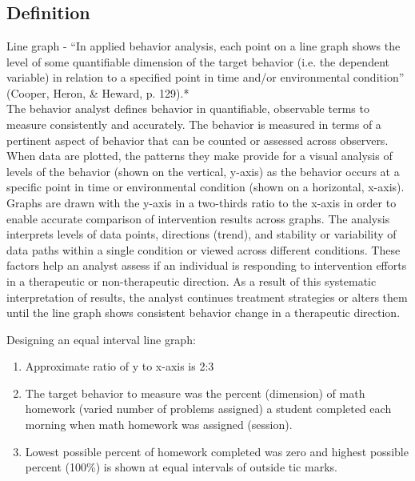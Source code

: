 \clearpage \section[\fouraTen{}]{\fouraTen{}%
              }
\subsection{Definition}
Line graph - ``In applied behavior analysis, each point on a line graph shows the level of some quantifiable dimension of the target behavior (i.e. the dependent variable) in relation to a specified point in time and/or environmental condition'' (Cooper, Heron, \& Heward, p. 129).*\\

The behavior analyst defines behavior in quantifiable, observable terms to measure consistently and accurately. The behavior is measured in terms of a pertinent aspect of behavior that can be counted or assessed across observers. When data are plotted, the patterns they make provide for a visual analysis of levels of the behavior (shown on the vertical, y-axis) as the behavior occurs at a specific point in time or environmental condition (shown on a horizontal, x-axis). Graphs are drawn with the y-axis in a two-thirds ratio to the x-axis in order to enable accurate comparison of intervention results across graphs. The analysis interprets levels of data points, directions (trend), and stability or variability of data paths within a single condition or viewed across different conditions. These factors help an analyst assess if an individual is responding to intervention efforts in a therapeutic or non-therapeutic direction. As a result of this systematic interpretation of results, the analyst continues treatment strategies or alters them until the line graph shows consistent behavior change in a therapeutic direction.

Designing an equal interval line graph:
\begin{enumerate}
\item Approximate ratio of y to x-axis is 2:3
\item The target behavior to measure was the percent (dimension) of math homework (varied number of problems assigned) a student completed each morning when math homework was assigned (session).
\item Lowest possible percent of homework completed was zero and highest possible percent (100\%) is shown at equal intervals of outside tic marks.
\end{enumerate}

